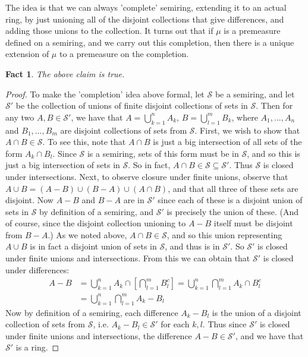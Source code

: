 \documentclass{article}
\theoremstyle{definition}
\theoremstyle{plain}
\theoremstyle{theorem}
\newtheorem{fact}{Fact}[section]
\begin{document}
The idea is that we can always 'complete' semiring, extending it to an actual ring, by just unioning all of the disjoint collections that give differences, and adding those unions to the collection. It turns out that if $\mu$ is a premeasure defined on a semiring, and we carry out this completion, then there is a unique extension of $\mu$ to a premeasure on the completion.
\begin{fact}
	The above claim is true.
\end{fact} 
\begin{proof}
	To make the 'completion' idea above formal, let $\mathcal{S}$ be a semiring, and let $\mathcal{S}'$ be the collection of unions of finite disjoint collections of sets in $\mathcal{S}$. Then for any two $A,B \in \mathcal{S}'$, we have that $A = \bigcup_{k=1}^n A_k$, $B = \bigcup_{l=1}^m B_k$, where $A_1,...,A_n$ and $B_1,...,B_m$ are disjoint collections of sets from $\mathcal{S}$. First, we wish to show that $A \cap B \in \mathcal{S}$. To see this, note that $A \cap B$ is just a big intersection of all sets of the form $A_k \cap B_l$. Since $\mathcal{S}$ is a semiring, sets of this form must be in $\mathcal{S}$, and so this is just a big intersection of sets in $\mathcal{S}$. So in fact, $A \cap B \in \mathcal{S} \subseteq \mathcal{S}'$. Thus $\mathcal{S}$ is closed under intersections. Next, to observe closure under finite unions, observe that $A \cup B = (A-B) \cup (B-A) \cup (A \cap B)$, and that all three of these sets are disjoint. Now $A-B$ and $B-A$ are in $\mathcal{S}'$ since each of these is a disjoint union of sets in $\mathcal{S}$ by definition of a semiring, and $\mathcal{S}'$ is precisely the union of these. (And of course, since the disjoint collection unioning to $A-B$ itself must be disjoint from $B-A$.) As we noted above, $A \cap B \in \mathcal{S}$, and so this union representing $A\cup B$ is in fact a disjoint union of sets in $\mathcal{S}$, and thus is in $\mathcal{S}'$. So $\mathcal{S}'$ is closed under finite unions and intersections. From this we can obtain that $\mathcal{S}'$ is closed under differences: 
	\begin{align}
		A-B &= \bigcup_{k=1}^n A_k \cap \left[ \bigcap_{l=1}^m B_l^c \right]
			= \bigcup_{k=1}^n \bigcap_{l=1}^m A_k \cap B_l^c \\
			&= \bigcup_{k=1}^n \bigcap_{l=1}^m A_k - B_l
	\end{align}
Now by definition of a semiring, each difference $A_k-B_l$ is the union of a disjoint collection of sets from $\mathcal{S}$, i.e. $A_k-B_l \in \mathcal{S}'$ for each $k,l$. Thus since $\mathcal{S}'$ is closed under finite unions and intersections, the difference $A-B \in \mathcal{S}'$, and we have that $\mathcal{S}'$ is a ring. \par 

\end{proof}
\end{document}
